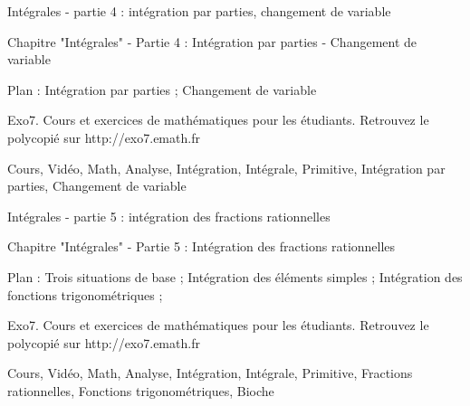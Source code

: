 
Intégrales - partie 4 : intégration par parties, changement de variable



Chapitre "Intégrales" - Partie 4 : Intégration par parties - Changement de variable

Plan : Intégration par parties ; Changement de variable

Exo7. Cours et exercices de mathématiques pour les étudiants.
Retrouvez le polycopié sur http://exo7.emath.fr


Cours, Vidéo, Math, Analyse, Intégration, Intégrale, Primitive, Intégration par parties,
Changement de variable



Intégrales - partie 5 : intégration des fractions rationnelles



Chapitre "Intégrales" - Partie 5 : Intégration des fractions rationnelles

Plan : Trois situations de base ; Intégration des éléments simples ; 
Intégration des fonctions trigonométriques ; 

Exo7. Cours et exercices de mathématiques pour les étudiants.
Retrouvez le polycopié sur http://exo7.emath.fr


Cours, Vidéo, Math, Analyse, Intégration, Intégrale, Primitive, Fractions rationnelles, 
Fonctions trigonométriques, Bioche






